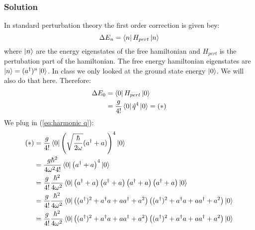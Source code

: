 \documentclass{article}
\begin{document}
	\subsubsection*{Solution}
	In standard perturbation theory the first order correction is given bey:
	\begin{equation*}
		\Delta E_n = \bra{n}H_{pert}\ket{n} 
	\end{equation*}
	where $\ket{n}$ are the energy eigenstates of the free hamiltonian and $H_{pert}$ is the pertubation part of the hamiltonian. The free energy hamiltonian eigenstates are $\ket{n}=(a^{\dagger})^n\ket{0}$. In class we only looked at the ground state energy $\ket{0}$. We will also do that here. Therefore:
	\begin{equation*}
		\begin{split}
			\Delta E_0 &= \bra{0}H_{pert}\ket{0}\\
			&= \frac{g}{4!}\bra{0}\hat{q}^4\ket{0}=(*)
		\end{split}
	\end{equation*}
	We plug in (\ref{eq:harmonic q}):
	\begin{equation*}
		\begin{split}
		 		(*)&=\frac{g}{4!}\bra{0}\left(\sqrt{\frac{\hbar}{2\omega}}(a^\dagger + a) \right) ^4\ket{0}\\
		 		&= \frac{g\hbar^2}{4\omega^2 4!}\bra{0}\left(a^\dagger + a\right) ^4\ket{0}\\
		 		&= \frac{g}{4!}\frac{\hbar^2}{4\omega^2 }\bra{0}\left(a^\dagger + a\right)\left(a^\dagger + a\right)\left(a^\dagger + a\right)\left(a^\dagger + a\right)\ket{0}\\
		 		&= \frac{g}{4!}\frac{\hbar^2}{4\omega^2 }\bra{0}\left((a^\dagger)^2+a^\dagger a + aa^\dagger + a^2\right)\left((a^\dagger)^2+a^\dagger a + aa^\dagger + a^2\right)\ket{0}\\
		 		&= \frac{g}{4!}\frac{\hbar^2}{4\omega^2 }\bra{0}\left((a^\dagger)^2+a^\dagger a + aa^\dagger + a^2\right)\left((a^\dagger)^2+a^\dagger a + aa^\dagger + a^2\right)\ket{0}
		\end{split}
	\end{equation*}
\end{document}
